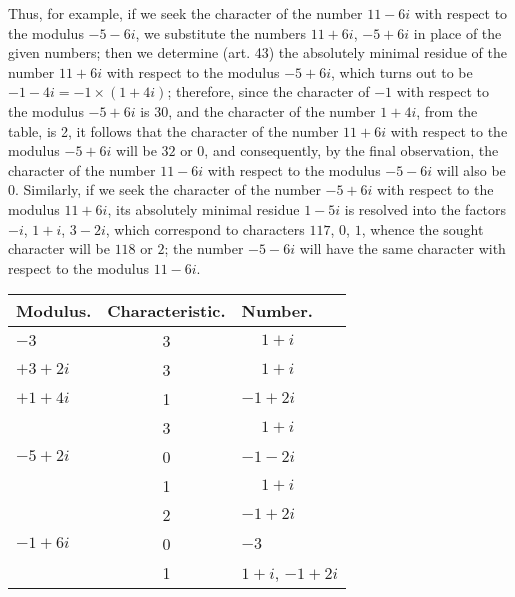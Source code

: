\documentclass[twoside,12pt]{memoir}
\begin{document}
Thus, for example, if we seek the character of the number \(11-6 i\) with respect to the modulus \(-5-6 i\), we substitute the numbers \(11+6 i\), \(-5+6 i\) in place of the given numbers; then we determine (art. 43) the absolutely minimal residue of the number \(11+6 i\) with respect to the modulus \(-5+6 i\), which turns out to be \(-1-4 i=-1 \times(1+4 i)\); therefore, since the character of \(-1\) with respect to the modulus \(-5+6 i\) is \(30\), and the character of the number \(1+4 i\), from the table, is 2, it follows that the character of the number \(11+6 i\) with respect to the modulus \(-5+6 i\) will be \(32\) or \(0\), and consequently, by the final observation, the character of the number \(11-6 i\) with respect to the modulus \(-5-6 i\) will also be \(0\). Similarly, if we seek the character of the number \(-5+6 i\) with respect to the modulus \(11+6 i\), its absolutely minimal residue \(1-5 i\) is resolved into the factors \(-i\), \(1+i\), \(3-2 i\), which correspond to characters \(117\), \(0\), \(1\), whence the sought character will be \(118\) or \(2\); the number \(-5-6 i\) will have the same character with respect to the modulus \(11-6 i\).
\begin{center}
\begin{tabular}{l|c|l}
Modulus. & Characteristic. & Number. \\
\hline
\(-3\) & 3 & \(\phantom{+}1+i\) \\
\(+3+2 i\) & 3 & \(\phantom{+}1+i\) \\
\(+1+4 i\) & 1 & \(-1+2 i\) \\
 & 3 & \(\phantom{+}1+i\) \\
\(-5+2 i\)& 0 & \(-1-2 i\) \\
 & 1 & \(\phantom{+}1+i\) \\
& 2 & \(-1+2 i\) \\
\(-1+6 i\) & 0 & \(-3\) \\
 &1&\(1+i\), \(-1+2i\)
\end{tabular}
\end{center}
%
\end{document}
